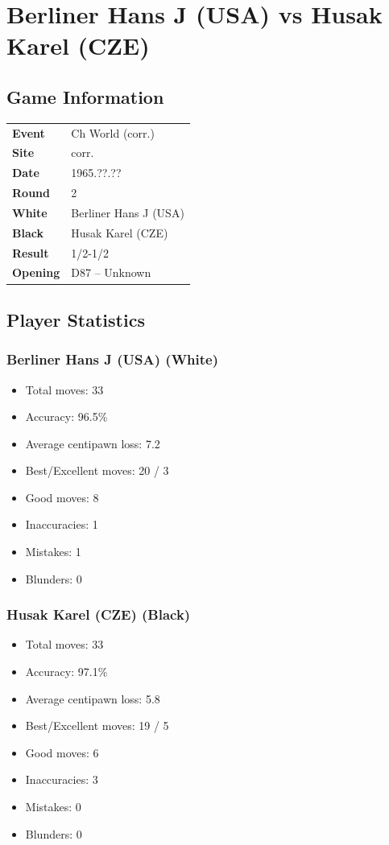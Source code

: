 \documentclass[11pt]{book}
\begin{document}
\chapter{Berliner Hans J (USA) vs Husak Karel (CZE)}

\section{Game Information}
\begin{tabular}{ll}
\textbf{Event} & Ch World (corr.) \\
\textbf{Site} & corr. \\
\textbf{Date} & 1965.??.?? \\
\textbf{Round} & 2 \\
\textbf{White} & Berliner Hans J (USA) \\
\textbf{Black} & Husak Karel (CZE) \\
\textbf{Result} & 1/2-1/2 \\
\textbf{Opening} & D87 -- Unknown \\
\end{tabular}

\section{Player Statistics}

\subsection{Berliner Hans J (USA) (White)}
\begin{itemize}
\item Total moves: 33
\item Accuracy: 96.5\%
\item Average centipawn loss: 7.2
\item Best/Excellent moves: 20 / 3
\item Good moves: 8
\item Inaccuracies: 1
\item Mistakes: 1
\item Blunders: 0
\end{itemize}

\subsection{Husak Karel (CZE) (Black)}
\begin{itemize}
\item Total moves: 33
\item Accuracy: 97.1\%
\item Average centipawn loss: 5.8
\item Best/Excellent moves: 19 / 5
\item Good moves: 6
\item Inaccuracies: 3
\item Mistakes: 0
\item Blunders: 0
\end{itemize}
\end{document}
